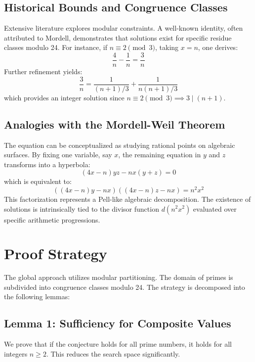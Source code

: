 \documentclass[12pt, a4paper]{article}
\begin{document}
\subsection{Historical Bounds and Congruence Classes}
Extensive literature explores modular constraints. A well-known identity, often attributed to Mordell, demonstrates that solutions exist for specific residue classes modulo 24.
For instance, if $n \equiv 2 \pmod{3}$, taking $x = n$, one derives:
\begin{equation}
\frac{4}{n} - \frac{1}{n} = \frac{3}{n}
\end{equation}
Further refinement yields:
\begin{equation}
\frac{3}{n} = \frac{1}{(n+1)/3} + \frac{1}{n(n+1)/3}
\end{equation}
which provides an integer solution since $n \equiv 2 \pmod{3} \implies 3 \mid (n+1)$.

\subsection{Analogies with the Mordell-Weil Theorem}
The equation can be conceptualized as studying rational points on algebraic surfaces. By fixing one variable, say $x$, the remaining equation in $y$ and $z$ transforms into a hyperbola:
\begin{equation}
(4x-n)yz - nx(y+z) = 0
\end{equation}
which is equivalent to:
\begin{equation}
( (4x-n)y - nx ) ( (4x-n)z - nx ) = n^2 x^2
\end{equation}
This factorization represents a Pell-like algebraic decomposition. The existence of solutions is intrinsically tied to the divisor function $d(n^2 x^2)$ evaluated over specific arithmetic progressions.

\newpage
\section{Proof Strategy}

The global approach utilizes modular partitioning. The domain of primes is subdivided into congruence classes modulo 24. The strategy is decomposed into the following lemmas:

\subsection{Lemma 1: Sufficiency for Composite Values}
We prove that if the conjecture holds for all prime numbers, it holds for all integers $n \ge 2$. This reduces the search space significantly.
\end{document}
